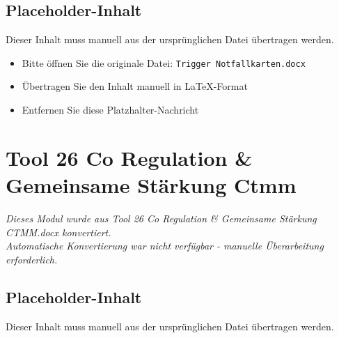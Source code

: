 
\subsection{Placeholder-Inhalt}

Dieser Inhalt muss manuell aus der ursprünglichen Datei übertragen werden.

\begin{itemize}
\item Bitte öffnen Sie die originale Datei: \texttt{Trigger Notfallkarten.docx}
\item Übertragen Sie den Inhalt manuell in LaTeX-Format
\item Entfernen Sie diese Platzhalter-Nachricht
\end{itemize}




\section{Tool 26 Co Regulation & Gemeinsame Stärkung Ctmm}
\label{sec:tool-26-co-regulation-&-gemeinsame-stärkung-ctmm}

\begin{center}
\textit{Dieses Modul wurde aus Tool 26 Co Regulation & Gemeinsame Stärkung CTMM.docx konvertiert.\\
Automatische Konvertierung war nicht verfügbar - manuelle Überarbeitung erforderlich.}
\end{center}


\subsection{Placeholder-Inhalt}

Dieser Inhalt muss manuell aus der ursprünglichen Datei übertragen werden.

